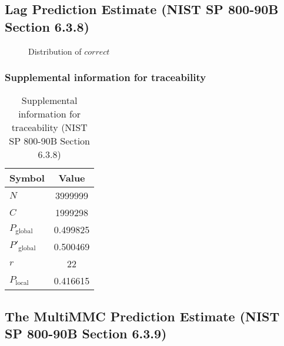 \documentclass[a3paper,xelatex,english]{bxjsarticle}
\begin{document}
\subsection{Lag Prediction Estimate (NIST SP 800-90B Section 6.3.8)}\label{sec:Binary638}

\begin{figure}[htbp]
\centering

\caption{Distribution of $correct$}
\end{figure}
\subsubsection{Supplemental information for traceability}
\renewcommand{\arraystretch}{1.8}
\begin{table}[h]
\caption{Supplemental information for traceability (NIST SP 800-90B Section 6.3.8)}
\begin{center}
\begin{tabular}{|l|c|}
\hline 
\rowcolor{anotherlightblue} %
Symbol				& Value \\ \hline 
$N$				& 3999999\\ \hline 
$C$				& 1999298\\ \hline 
$P_{\textrm{global}}$				& 0.499825\\ \hline 
$P'_{\textrm{global}}$			& 0.500469\\ \hline 
$r$				& 22\\ \hline 
$P_{\textrm{local}}$ 			& 0.416615\\ \hline
\end{tabular}
\end{center}
\end{table}
\renewcommand{\arraystretch}{1.4}
\clearpage
\subsection{The MultiMMC Prediction Estimate (NIST SP 800-90B Section 6.3.9)}\label{sec:Binary639}
\end{document}
